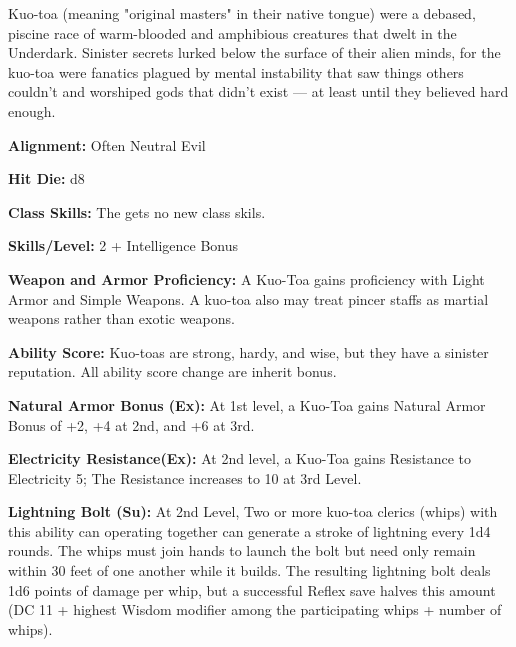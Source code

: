 
Kuo-toa (meaning "original masters" in their native tongue) were a debased, piscine race of warm-blooded and amphibious creatures that dwelt in the Underdark. Sinister secrets lurked below the surface of their alien minds, for the kuo-toa were fanatics plagued by mental instability that saw things others couldn't and worshiped gods that didn't exist — at least until they believed hard enough.

\textbf{Alignment:} Often Neutral Evil

\textbf{Hit Die:} d8

\textbf{Class Skills:} The \currentclassname{} gets no new class skils.

\textbf{Skills/Level:} 2 + Intelligence Bonus

\goodbab{}
\poorfor{}
\poorref{}
\goodwil{}

\begin{classtable}
\end{classtable}

\classfeatures

\textbf{Weapon and Armor Proficiency:} A Kuo-Toa gains proficiency with Light Armor and Simple Weapons. A kuo-toa also may treat pincer staffs as martial weapons rather than exotic weapons.

\textbf{Ability Score:} Kuo-toas are strong, hardy, and wise, but they have a sinister reputation. All ability score change are inherit bonus.
 
 \textbf{Natural Armor Bonus (Ex):} At 1st level, a Kuo-Toa gains Natural Armor Bonus of +2, +4 at 2nd, and +6 at 3rd.
 
\textbf{Electricity Resistance(Ex):} At 2nd level, a Kuo-Toa gains Resistance to Electricity 5; The Resistance increases to 10 at 3rd Level.
 
\textbf{Lightning Bolt (Su):} At 2nd Level, Two or more kuo-toa clerics (whips) with this ability can operating together can generate a stroke of lightning every 1d4 rounds. The whips must join hands to launch the bolt but need only remain within 30 feet of one another while it builds. The resulting lightning bolt deals 1d6 points of damage per whip, but a successful Reflex save halves this amount (DC 11 + highest Wisdom modifier among the participating whips + number of whips).